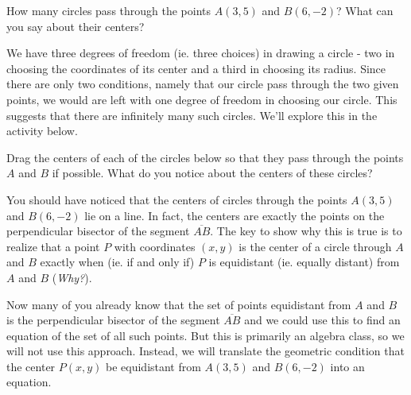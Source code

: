 \documentclass{ximera}
\begin{document}
\fi          %



\begin{example}  \label{Ex5}
How many circles pass through the points $A(3,5)$ and $B(6,-2)$? What can you say about their centers?
\end{example}

\begin{explanation}
We have three degrees of freedom (ie. three choices) in drawing a circle - two in choosing the coordinates of its center and a third in choosing its radius. Since there are only two conditions, namely that our circle pass through the two given points, we would are left with one degree of freedom in choosing our circle. This suggests that there are infinitely many such circles. We'll explore this in the activity below. 


\begin{exploration}\label{exp:circle1}
Drag the centers of each of the circles below so that they pass through the points $A$ and $B$ if possible. What do you notice about the centers of these circles?
 
 
\begin{onlineOnly}
    \begin{center}
\end{center}
\end{onlineOnly}
\end{exploration}

You should have noticed that the centers of circles through the points $A(3,5)$ and $B(6,-2)$ lie on a line. In fact, the centers are exactly the points on the perpendicular bisector of the segment $\overline{AB}$. The key to show why this is true is to realize that a point $P$ with coordinates $(x,y)$ is the center of a circle through $A$ and $B$ exactly when (ie. if and only if) $P$ is equidistant (ie. equally distant) from $A$ and $B$ (\emph{Why?}). 

Now many of you already know that the set of points equidistant from $A$ and $B$ is the perpendicular bisector of the segment $\overline{AB}$ and we could use this to find an equation of the set of all such points. But this is primarily an algebra class, so we will not use this approach. Instead, we will translate the geometric condition that the center $P(x,y)$ be equidistant from $A(3,5)$ and $B(6,-2)$ into an equation.


\end{explanation}
\end{document}
